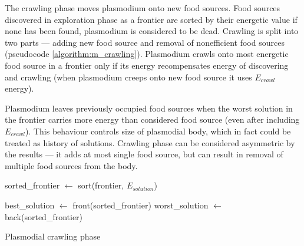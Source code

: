 The crawling phase moves plasmodium onto new food sources. Food sources discovered in exploration phase as a frontier are sorted by their energetic value if none has been found, plasmodium is considered to be dead. Crawling is split into two parts --- adding new food source and removal of nonefficient food sources (pseudocode \ref{algorithm:m_crawling}). Plasmodium crawls onto most energetic food source in a frontier only if its energy recompensates energy of discovering and crawling (when plasmodium creeps onto new food source it uses $E_{crawl}$ energy). 

Plasmodium leaves previously occupied food sources when the worst solution in the frontier carries more energy than considered food source (even after including $E_{crawl}$). This behaviour controls size of plasmodial body, which in fact could be treated as history of solutions. Crawling phase can be considered asymmetric by the results --- it adds at most single food source, but can result in removal of multiple food sources from the body.

\begin{algorithm}
  \BlankLine


  sorted\_frontier $\leftarrow$ sort(frontier, $E_{solution}$)\;

  best\_solution $\leftarrow$ front(sorted\_frontier)\;
  worst\_solution $\leftarrow$ back(sorted\_frontier)\;


  \;

  \caption{Plasmodial crawling phase}
  \label{algorithm:m_crawling}
\end{algorithm}


